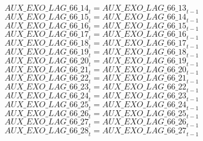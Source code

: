 \begin{dmath}
{AUX\_EXO\_LAG\_66\_14}_{t}={AUX\_EXO\_LAG\_66\_13}_{t-1}
\end{dmath}
\begin{dmath}
{AUX\_EXO\_LAG\_66\_15}_{t}={AUX\_EXO\_LAG\_66\_14}_{t-1}
\end{dmath}
\begin{dmath}
{AUX\_EXO\_LAG\_66\_16}_{t}={AUX\_EXO\_LAG\_66\_15}_{t-1}
\end{dmath}
\begin{dmath}
{AUX\_EXO\_LAG\_66\_17}_{t}={AUX\_EXO\_LAG\_66\_16}_{t-1}
\end{dmath}
\begin{dmath}
{AUX\_EXO\_LAG\_66\_18}_{t}={AUX\_EXO\_LAG\_66\_17}_{t-1}
\end{dmath}
\begin{dmath}
{AUX\_EXO\_LAG\_66\_19}_{t}={AUX\_EXO\_LAG\_66\_18}_{t-1}
\end{dmath}
\begin{dmath}
{AUX\_EXO\_LAG\_66\_20}_{t}={AUX\_EXO\_LAG\_66\_19}_{t-1}
\end{dmath}
\begin{dmath}
{AUX\_EXO\_LAG\_66\_21}_{t}={AUX\_EXO\_LAG\_66\_20}_{t-1}
\end{dmath}
\begin{dmath}
{AUX\_EXO\_LAG\_66\_22}_{t}={AUX\_EXO\_LAG\_66\_21}_{t-1}
\end{dmath}
\begin{dmath}
{AUX\_EXO\_LAG\_66\_23}_{t}={AUX\_EXO\_LAG\_66\_22}_{t-1}
\end{dmath}
\begin{dmath}
{AUX\_EXO\_LAG\_66\_24}_{t}={AUX\_EXO\_LAG\_66\_23}_{t-1}
\end{dmath}
\begin{dmath}
{AUX\_EXO\_LAG\_66\_25}_{t}={AUX\_EXO\_LAG\_66\_24}_{t-1}
\end{dmath}
\begin{dmath}
{AUX\_EXO\_LAG\_66\_26}_{t}={AUX\_EXO\_LAG\_66\_25}_{t-1}
\end{dmath}
\begin{dmath}
{AUX\_EXO\_LAG\_66\_27}_{t}={AUX\_EXO\_LAG\_66\_26}_{t-1}
\end{dmath}
\begin{dmath}
{AUX\_EXO\_LAG\_66\_28}_{t}={AUX\_EXO\_LAG\_66\_27}_{t-1}
\end{dmath}
